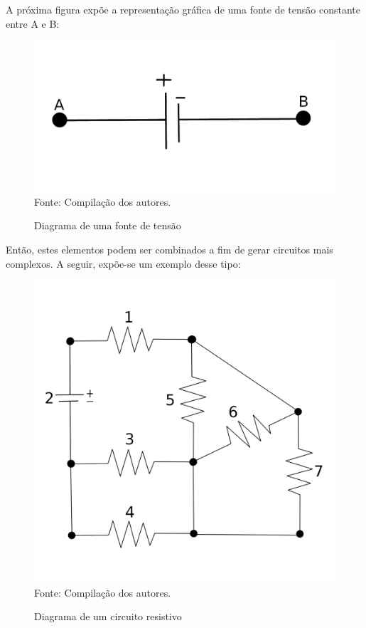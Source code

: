 \documentclass[twocolumn, 10pt]{extarticle}
\begin{document}
A próxima figura expõe a representação gráfica de uma fonte de tensão constante entre A e B:

\begin{figure}[H]
	\caption{Diagrama de uma fonte de tensão} 
	\centering
	\includegraphics[scale=0.7]{vcc1}
	\\ Fonte: Compilação dos autores.
\end{figure}

Então, estes elementos podem ser combinados a fim de gerar circuitos mais complexos. A seguir, expõe-se um exemplo desse tipo:

\begin{figure}[H]
	\caption{Diagrama de um circuito resistivo} 
	\centering
	\includegraphics[scale=0.35]{circ1}
	\\ Fonte: Compilação dos autores.
\end{figure}
\end{document}
